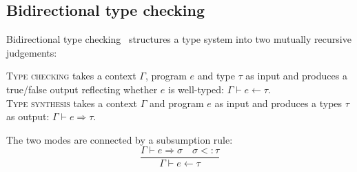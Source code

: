 
\subsection{Bidirectional type checking}

Bidirectional type checking~\cite{Pierce2000Local} structures a type system into two mutually recursive judgements:

\begin{tcolorbox}[colback=blue!5!white,colframe=blue!75!black]
  \textsc{Type checking} takes a context $\Gamma$, program $e$ and type $\tau$ as input and produces a true/false output reflecting whether $e$ is well-typed: $\Gamma \vdash e \leftarrow \tau$. \\

  \textsc{Type synthesis} takes a context $\Gamma$ and program $e$ as input and produces a types $\tau$ as output: $\Gamma \vdash e \Rightarrow \tau$.
\end{tcolorbox}

\noindent The two modes are connected by a subsumption rule:
$$
  \frac{\Gamma \vdash e \Rightarrow \sigma \quad \sigma <: \tau}{\Gamma \vdash e \leftarrow \tau}
$$



